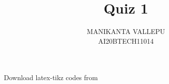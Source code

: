 \documentclass[journal,12pt,twocolumn]{IEEEtran}
\DeclareMathOperator*{\Res}{Res}
\begin{document}
\newcommand{\BEQA}{\begin{eqnarray}}
\newcommand{\EEQA}{\end{eqnarray}}
\newcommand{\define}{\stackrel{\triangle}{=}}

\raggedbottom
\setlength{\parindent}{0pt}
\providecommand{\mbf}{\mathbf}
\providecommand{\pr}[1]{\ensuremath{\Pr\left(#1\right)}}
\providecommand{\qfunc}[1]{\ensuremath{Q\left(#1\right)}}
\providecommand{\sbrak}[1]{\ensuremath{{}\left[#1\right]}}
\providecommand{\lsbrak}[1]{\ensuremath{{}\left[#1\right.}}
\providecommand{\rsbrak}[1]{\ensuremath{{}\left.#1\right]}}
\providecommand{\brak}[1]{\ensuremath{\left(#1\right)}}
\providecommand{\lbrak}[1]{\ensuremath{\left(#1\right.}}
\providecommand{\rbrak}[1]{\ensuremath{\left.#1\right)}}
\providecommand{\cbrak}[1]{\ensuremath{\left\{#1\right\}}}
\providecommand{\lcbrak}[1]{\ensuremath{\left\{#1\right.}}
\providecommand{\rcbrak}[1]{\ensuremath{\left.#1\right\}}}
\theoremstyle{remark}
\newtheorem{rem}{Remark}
\newcommand{\sgn}{\mathop{\mathrm{sgn}}}
\providecommand{\abs}[1]{\vert#1\vert}
\providecommand{\res}[1]{\Res\displaylimits_{#1}} 
\providecommand{\norm}[1]{\lVert#1\rVert}
\providecommand{\mtx}[1]{\mathbf{#1}}
\providecommand{\mean}[1]{E[ #1 ]}
\providecommand{\fourier}{\overset{\mathcal{F}}{ \rightleftharpoons}}
\providecommand{\system}{\overset{\mathcal{H}}{ \longleftrightarrow}}
\newcommand{\solution}{\noindent \textbf{Solution: }}
\newcommand{\cosec}{\,\text{cosec}\,}
\providecommand{\dec}[2]{\ensuremath{\overset{#1}{\underset{#2}{\gtrless}}}}
\newcommand{\myvec}[1]{\ensuremath{\begin{pmatrix}#1\end{pmatrix}}}
\newcommand{\mydet}[1]{\ensuremath{\begin{vmatrix}#1\end{vmatrix}}}

\makeatletter
{}
\makeatother
\let\StandardTheFigure\thefigure
\let\vec\mathbf
\renewcommand{\thefigure}{\theproblem}
\def\putbox#1#2#3{\makebox[0in][l]{\makebox[#1][l]{}\raisebox{\baselineskip}[0in][0in]{\raisebox{#2}[0in][0in]{#3}}}}
     \def\rightbox#1{\makebox[0in][r]{#1}}
     \def\centbox#1{\makebox[0in]{#1}}
     \def\topbox#1{\raisebox{-\baselineskip}[0in][0in]{#1}}
     \def\midbox#1{\raisebox{-0.5\baselineskip}[0in][0in]{#1}}
\vspace{3cm}
\title{Quiz 1}
\author{MANIKANTA VALLEPU \\ AI20BTECH11014}
\maketitle
\newpage
\bigskip
\renewcommand{\thefigure}{\theenumi}
\renewcommand{\thetable}{\theenumi}
Download latex-tikz codes from 
%
\begin{lstlisting}

\end{lstlisting}
\end{document}

